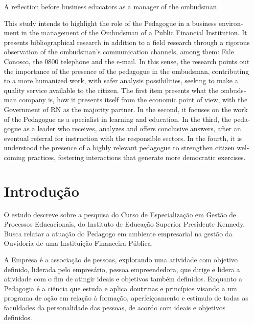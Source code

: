 \begin{refsection}
    
    \begin{otherlanguage}{english}

    \fakeChapterOneLine
    {A reflection before business educators as a manager of the ombudsman}

    \begin{galoResumo}[Abstract]
        This study intends to highlight the role of the Pedagogue in a business environment in the management of the Ombudsman of a Public Financial Institution. It presents bibliographical research in addition to a field research through a rigorous observation of the ombudsman's communication channels, among them: Fale Conosco, the 0800 telephone and the e-mail. In this sense, the research points out the importance of the presence of the pedagogue in the ombudsman, contributing to a more humanized work, with safer analysis possibilities, seeking to make a quality service available to the citizen. The first item presents what the ombudsman company is, how it presents itself from the economic point of view, with the Government of RN as the majority partner. In the second, it focuses on the work of the Pedagogue as a specialist in learning and education. In the third, the pedagogue as a leader who receives, analyzes and offers conclusive answers, after an eventual referral for instruction with the responsible sectors. In the fourth, it is understood the presence of a highly relevant pedagogue to strengthen citizen welcoming practices, fostering interactions that generate more democratic exercises. 
    \end{galoResumo}
    
    \end{otherlanguage}


    \section{Introdução}

    O estudo descreve sobre a pesquisa do Curso de Especialização em Gestão de Processos Educacionais, do Instituto de Educação Superior Presidente Kennedy. Busca relatar a atuação do Pedagogo em ambiente empresarial na gestão da Ouvidoria de uma Instituição Financeira Pública.  

    A Empresa é a associação de pessoas, explorando uma atividade com objetivo definido, liderada pelo empresário, pessoa empreendedora, que dirige e lidera a atividade com o fim de atingir ideais e objetivos também definidos. Enquanto a Pedagogia é a ciência que estuda e aplica doutrinas e princípios visando a um programa de ação em relação à formação, aperfeiçoamento e estímulo de todas as faculdades da personalidade das pessoas, de acordo com ideais e objetivos definidos.  


\end{refsection}
